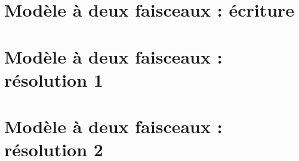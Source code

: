 \documentclass[a4paper,DIV16,10pt]{scrartcl}
\begin{document}
\newpage
\section{Modèle à deux faisceaux : écriture}


\newpage
\section{Modèle à deux faisceaux : résolution 1}


\newpage
\section{Modèle à deux faisceaux : résolution 2}

\end{document}
